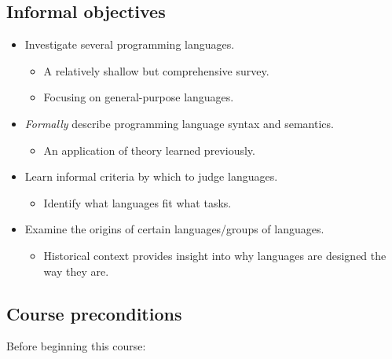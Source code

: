 \documentclass[11pt]{article}
\theoremstyle{definition}
\begin{document}
\subsection{Informal objectives}
\label{sec:orgfa83981}
\begin{itemize}
\item Investigate several programming languages.
\begin{itemize}
\item A relatively shallow but comprehensive survey.
\item Focusing on general-purpose languages.
\end{itemize}
\item \emph{Formally} describe programming language syntax and semantics.
\begin{itemize}
\item An application of theory learned previously.
\end{itemize}
\item Learn informal criteria by which to judge languages.
\begin{itemize}
\item Identify what languages fit what tasks.
\end{itemize}
\item Examine the origins of certain languages/groups of languages.
\begin{itemize}
\item Historical context provides insight into why languages
are designed the way they are.
\end{itemize}
\end{itemize}

\subsection{Course preconditions}
\label{sec:org99995fc}
Before beginning this course:
\end{document}
